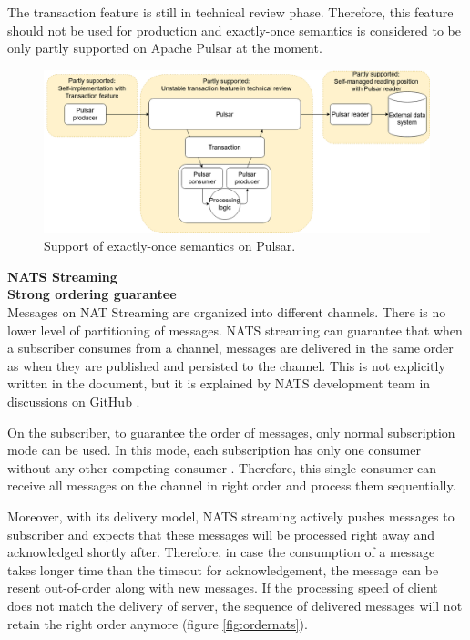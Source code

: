 The transaction feature is still in technical review phase. Therefore, this feature should not be used for production and exactly-once semantics is considered to be only partly supported on Apache Pulsar at the moment.


\begin{figure}[h]
	\centering
	\includegraphics[width=\linewidth]{images/exactly-once-pulsar.png}
	\caption{Support of exactly-once semantics on Pulsar.}
	\label{fig:exactlyoncepulsar}
\end{figure}




\large \textbf{NATS Streaming}\\
\normalsize
\textbf{Strong ordering guarantee}\\
Messages on NAT Streaming are organized into different channels. There is no lower level of partitioning of messages. NATS streaming can guarantee that when a subscriber consumes from a channel, messages are delivered in the same order as when they are published and persisted to the channel. This is not explicitly written in the document, but it is explained by NATS development team in discussions on GitHub \cite{natsorder}.

On the subscriber, to guarantee the order of messages, only normal subscription mode can be used. In this mode, each subscription has only one consumer without any other competing consumer \cite{natsconceptchannels}. Therefore, this single consumer can receive all messages on the channel in right order and process them sequentially.

Moreover, with its delivery model, NATS streaming actively pushes messages to subscriber and expects that these messages will be processed right away and acknowledged shortly after. Therefore, in case the consumption of a message takes longer time than the timeout for acknowledgement, the message can be resent out-of-order along with new messages. If the processing speed of client does not match the delivery of server, the sequence of delivered messages will not retain the right order anymore (figure \ref{fig:ordernats}).


